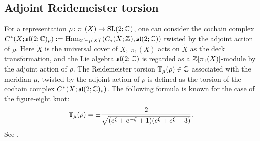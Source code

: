 \subsection{Adjoint Reidemeister torsion}
For a representation $\rho\colon\pi_1(X)\to\rm{SL}(2;\mathbb{C})$, one can consider the cochain complex $C^{\ast}(X;\mathfrak{sl}(2;\mathbb{C})_{\rho}):=\operatorname{Hom}_{\mathbb{Z}[\pi_1(X)]}(C_{\ast}(\tilde{X};\mathbb{Z}),\mathfrak{sl}(2;\mathbb{C}))$ twisted by the adjoint action of $\rho$.
Here $\tilde{X}$ is the universal cover of $X$, $\pi_1(X)$ acts on $\tilde{X}$ as the deck transformation, and the Lie algebra $\mathfrak{sl}(2;\mathbb{C})$ is regarded as a $\mathbb{Z}[\pi_1(X)]$-module by the adjoint action of $\rho$.
The Reidemeister torsion $\mathbb{T}_{\mu}(\rho)\in\mathbb{C}$ associated with the meridian $\mu$, twisted by the adjoint action of $\rho$ is defined as the torsion of the cochain complex $C^{\ast}(X;\mathfrak{sl}(2;\mathbb{C})_{\rho})$.
The following formula is known for the case of the figure-eight knot:
\begin{equation*}
  {\mathbb{T}}_{\mu}(\rho)
  =
  \pm
  \frac{2}{\sqrt{(e^{\xi}+e^{-\xi}+1)(e^{\xi}+e^{\xi}-3)}}.
\end{equation*}
See \cite{Porti:MAMCAU1997,Dubois:CANMB2006,Murakami:JTOP2013}.
